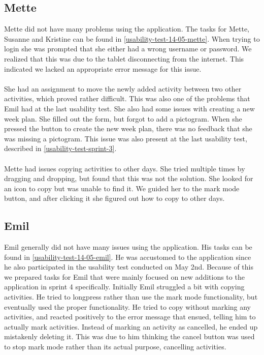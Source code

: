\subsection{Mette}
Mette did not have many problems using the application.
The tasks for Mette, Susanne and Kristine can be found in \autoref{usability-test-14-05-mette}.
When trying to login she was prompted that she either had a wrong username or password. 
We realized that this was due to the tablet disconnecting from the internet.
This indicated we lacked an appropriate error message for this issue.
\\\\
She had an assignment to move the newly added activity between two other activities, which proved rather difficult. 
This was also one of the problems that Emil had at the last usability test.
She also had some issues with creating a new week plan.
She filled out the form, but forgot to add a pictogram. 
When she pressed the button to create the new week plan, there was no feedback that she was missing a pictogram.
This issue was also present at the last usability test, described in \autoref{usability-test-sprint-3}.
\\\\
Mette had issues copying activities to other days.
She tried multiple times by dragging and dropping, but found that this was not the solution.
She looked for an icon to copy but was unable to find it. 
We guided her to the mark mode button, and after clicking it she figured out how to copy to other days.

\subsection{Emil}
Emil generally did not have many issues using the application. 
His tasks can be found in \autoref{usability-test-14-05-emil}.
He was accustomed to the application since he also participated in the usability test conducted on May 2nd. 
Because of this we prepared tasks for Emil that were mainly focused on new additions to the application in sprint 4 specifically.
Initially Emil struggled a bit with copying activities.
He tried to longpress rather than use the mark mode functionality, but eventually used the proper functionality.
He tried to copy without marking any activities, and reacted positively to the error message that ensued, telling him to actually mark activities.
Instead of marking an activity as cancelled, he ended up mistakenly deleting it.
This was due to him thinking the cancel button was used to stop mark mode rather than its actual purpose, cancelling activities.

